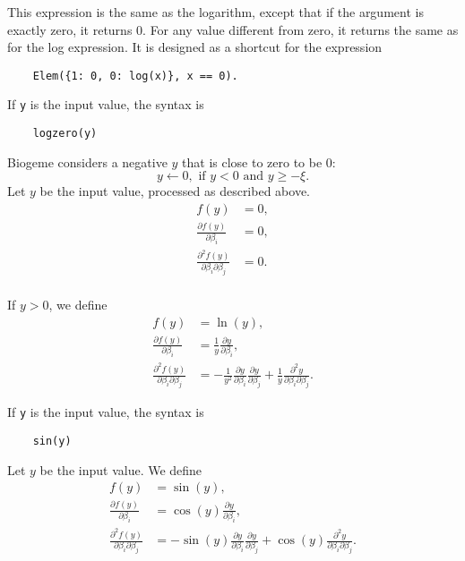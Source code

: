\documentclass[12pt,a4paper]{article}
\begin{document}
\begin{description}
\item[Logarithm or zero] This expression is the same as the logarithm,
  except that if the argument is exactly zero, it returns 0. For any
  value different from zero, it returns the same as for the log
  expression. It is designed as a shortcut for the expression
  \begin{lstlisting}
    Elem({1: 0, 0: log(x)}, x == 0).
  \end{lstlisting}

  If \lstinline+y+ is the input value, the syntax is
  \begin{lstlisting}
    logzero(y)
  \end{lstlisting}
  Biogeme considers a negative $y$ that is close to zero to be 0:
  \[
  y \leftarrow 0, \text{ if } y < 0 \text{ and } y \geq -\xi.
  \]
  Let $y$ be the input value, processed as described above.
    \begin{align*}
      f(y) &=  0,\\
      \frac{\partial f(y)}{\partial \beta_i} &= 0,\\
      \frac{\partial^2 f(y)}{\partial \beta_i\partial \beta_j} &= 0.\\
    \end{align*}
  \item If $y > 0$, we define
    \begin{align*}
    f(y)& =\ln(y), \\ 
    \frac{\partial f(y)}{\partial \beta_i} &= \frac{1}{y} \frac{\partial y}{\partial \beta_i}, \\
    \frac{\partial^2 f(y)}{\partial \beta_i \partial \beta_j} &=
    -\frac{1}{y^{2}}
    \frac{\partial y}{\partial \beta_i}
    \frac{\partial y}{\partial \beta_j }
    + \frac{1}{y}
    \frac{\partial^2 y}{\partial \beta_i \partial \beta_j}.
    \end{align*}



 \item[Sinus] If \lstinline+y+ is the input value, the syntax is
  \begin{lstlisting}
    sin(y)
  \end{lstlisting}
  Let $y$ be the input value. We define
  \begin{align*}
      f(y) &= \sin(y), \\
      \frac{\partial f(y)}{\partial \beta_i} &= \cos(y) \frac{\partial y}{\partial \beta_i},\\
      \frac{\partial^2 f(y)}{\partial \beta_i\partial \beta_j} &= -\sin(y)\frac{\partial y}{\partial \beta_i}\frac{\partial y}{\partial \beta_j} + \cos(y)\frac{\partial^2 y}{\partial \beta_i\partial \beta_j}.\\
  \end{align*}


\end{description}
\end{document}
